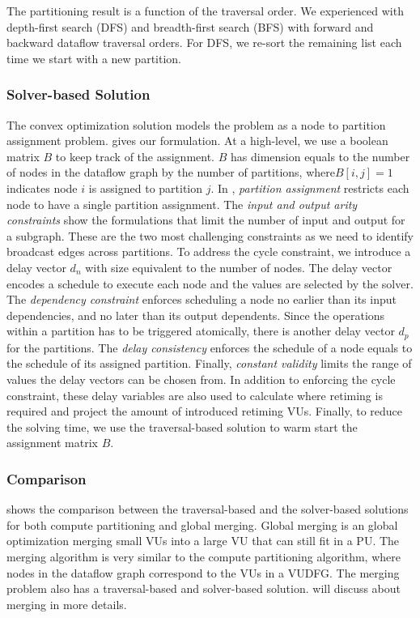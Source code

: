 The partitioning result is a function of the traversal order.
We experienced with depth-first search (DFS) and breadth-first search (BFS) with forward and
backward dataflow traversal orders.
For DFS, we re-sort the remaining list each time we start with a new partition.

\subsubsection{Solver-based Solution}
The convex optimization solution models the problem as a node to partition assignment problem.
 gives our formulation.
At a high-level, we use a boolean matrix $B$ to keep track of the assignment. 
$B$ has dimension equals to the number of nodes in the dataflow graph by the number of partitions, where$B[i,j]=1$ 
indicates node $i$ is assigned to partition $j$.
In , \emph{partition assignment} restricts each node to have a single partition assignment.
The \emph{input and output arity constraints} show the formulations that limit the number of input
and output for a subgraph.
These are the two most challenging constraints as we need to identify broadcast edges across partitions.
To address the cycle constraint, we introduce a delay vector $d_n$ with size equivalent to the number of nodes. 
The delay vector encodes a schedule to execute each node and the values are selected by the solver.
The \emph{dependency constraint} enforces scheduling a node no earlier than its input dependencies, and
no later than its output dependents.
Since the operations within a partition has to be triggered atomically, there is another delay
vector $d_p$ for the partitions. The \emph{delay consistency} enforces the schedule of a node equals to the
schedule of its assigned partition.
Finally, \emph{constant validity} limits the range of values the delay vectors can be chosen from.
In addition to enforcing the cycle constraint, 
these delay variables are also used to calculate where retiming is required and 
project the amount of introduced retiming VUs. 
Finally, to reduce the solving time, we use the traversal-based solution to warm start the assignment matrix
$B$.



\subsubsection{Comparison}
 shows the comparison between the traversal-based and the solver-based solutions for both
compute partitioning and global merging.
Global merging is an global optimization merging small VUs into a large VU that can still fit in
a PU. 
The merging algorithm is very similar to the compute partitioning algorithm, where nodes in the
dataflow graph correspond to the VUs in a VUDFG. 
The merging problem also has a traversal-based and solver-based solution.
 will discuss about merging in more details.

